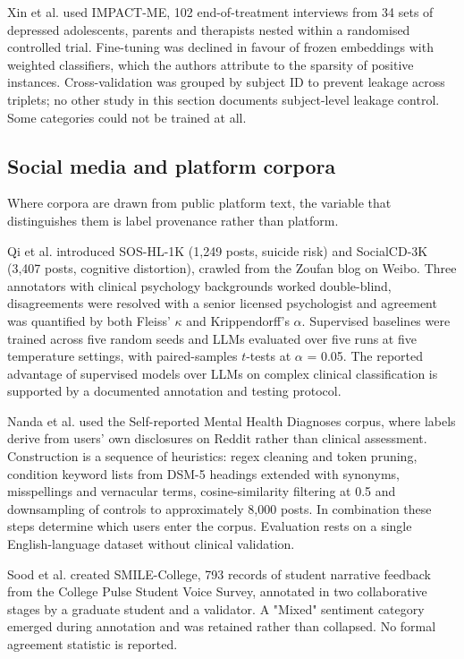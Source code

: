 \documentclass[11pt]{article}
\begin{document}
	Xin et al.\cite{xin2024outcomes} used IMPACT-ME, 102 end-of-treatment interviews from 34 sets of depressed adolescents, parents and therapists nested within a randomised controlled trial. Fine-tuning was declined in favour of frozen embeddings with weighted classifiers, which the authors attribute to the sparsity of positive instances. Cross-validation was grouped by subject ID to prevent leakage across triplets; no other study in this section documents subject-level leakage control. Some categories could not be trained at all.
	
	\subsection{Social media and platform corpora}
	
	Where corpora are drawn from public platform text, the variable that distinguishes them is label provenance rather than platform.
	
	Qi et al.\cite{qi2024supervisedlearninglargelanguage} introduced SOS-HL-1K (1,249 posts, suicide risk) and SocialCD-3K (3,407 posts, cognitive distortion), crawled from the Zoufan blog on Weibo. Three annotators with clinical psychology backgrounds worked double-blind, disagreements were resolved with a senior licensed psychologist and agreement was quantified by both Fleiss' $\kappa$ and Krippendorff's $\alpha$. Supervised baselines were trained across five random seeds and LLMs evaluated over five runs at five temperature settings, with paired-samples $t$-tests at $\alpha$ = 0.05. The reported advantage of supervised models over LLMs on complex clinical classification is supported by a documented annotation and testing protocol.
	
	Nanda et al.\cite{10714257} used the Self-reported Mental Health Diagnoses corpus, where labels derive from users' own disclosures on Reddit rather than clinical assessment. Construction is a sequence of heuristics: regex cleaning and token pruning, condition keyword lists from DSM-5 headings extended with synonyms, misspellings and vernacular terms, cosine-similarity filtering at 0.5 and downsampling of controls to approximately 8,000 posts. In combination these steps determine which users enter the corpus. Evaluation rests on a single English-language dataset without clinical validation.
	
	Sood et al.\cite{sood2024understandingstudentsentimentmental} created SMILE-College, 793 records of student narrative feedback from the College Pulse Student Voice Survey, annotated in two collaborative stages by a graduate student and a validator. A "Mixed" sentiment category emerged during annotation and was retained rather than collapsed. No formal agreement statistic is reported.
	
\end{document}
